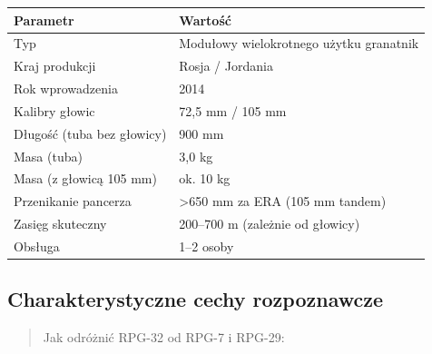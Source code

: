 \documentclass[12pt,oneside]{book}
\begin{document}
\begin{longtable}[]{@{}ll@{}}
\toprule\noalign{}
Parametr & Wartość \\
\midrule\noalign{}
\endhead
\bottomrule\noalign{}
\endlastfoot
Typ & Modułowy wielokrotnego użytku granatnik \\
Kraj produkcji & Rosja / Jordania \\
Rok wprowadzenia & 2014 \\
Kalibry głowic & 72,5 mm / 105 mm \\
Długość (tuba bez głowicy) & 900 mm \\
Masa (tuba) & 3,0 kg \\
Masa (z głowicą 105 mm) & ok. 10 kg \\
Przenikanie pancerza & \textgreater650 mm za ERA (105 mm tandem) \\
Zasięg skuteczny & 200--700 m (zależnie od głowicy) \\
Obsługa & 1--2 osoby \\
\end{longtable}

\subsection{Charakterystyczne cechy
rozpoznawcze}\label{charakterystyczne-cechy-rozpoznawcze-90}

\begin{quote}
Jak odróżnić RPG-32 od RPG-7 i RPG-29:
\end{quote}
\end{document}
